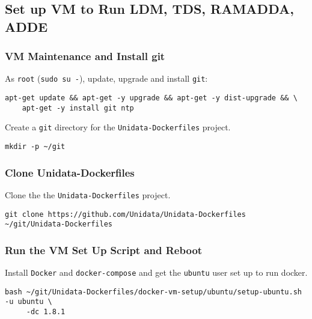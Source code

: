 \documentclass[onecolumn,9pt]{article}
\begin{document}
\subsection{Set up VM to Run LDM, TDS, RAMADDA, ADDE}
\label{sec:orgheadline30}
\subsubsection{VM Maintenance and Install git}
\label{sec:orgheadline14}

As \texttt{root} (\texttt{sudo su -}), update, upgrade and install \texttt{git}:

\lstset{frame=lines,basicstyle=\footnotesize,numbers=left,numberstyle=\tiny,language=sh,label= ,caption= ,captionpos=b}
\begin{lstlisting}
apt-get update && apt-get -y upgrade && apt-get -y dist-upgrade && \
    apt-get -y install git ntp
\end{lstlisting}

Create a \texttt{git} directory for the \texttt{Unidata-Dockerfiles} project.

\lstset{frame=lines,basicstyle=\footnotesize,numbers=left,numberstyle=\tiny,language=sh,label= ,caption= ,captionpos=b}
\begin{lstlisting}
mkdir -p ~/git
\end{lstlisting}

\subsubsection{Clone Unidata-Dockerfiles}
\label{sec:orgheadline15}

Clone the the \texttt{Unidata-Dockerfiles} project.

\lstset{frame=lines,basicstyle=\footnotesize,numbers=left,numberstyle=\tiny,language=:eval,label= ,caption= ,captionpos=b}
\begin{lstlisting}
git clone https://github.com/Unidata/Unidata-Dockerfiles ~/git/Unidata-Dockerfiles
\end{lstlisting}

\subsubsection{Run the VM Set Up Script and Reboot}
\label{sec:orgheadline16}

Install \texttt{Docker} and \texttt{docker-compose} and get the \texttt{ubuntu} user set up to run docker.

\lstset{frame=lines,basicstyle=\footnotesize,numbers=left,numberstyle=\tiny,language=sh,label= ,caption= ,captionpos=b}
\begin{lstlisting}
bash ~/git/Unidata-Dockerfiles/docker-vm-setup/ubuntu/setup-ubuntu.sh -u ubuntu \
     -dc 1.8.1
\end{lstlisting}
\end{document}
